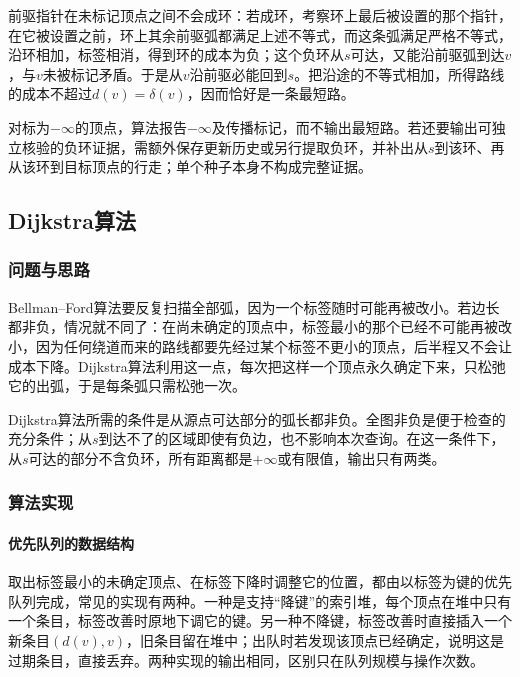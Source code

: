 前驱指针在未标记顶点之间不会成环：若成环，考察环上最后被设置的那个指针，在它被设置之前，环上其余前驱弧都满足上述不等式，而这条弧满足严格不等式，沿环相加，标签相消，得到环的成本为负；这个负环从$s$可达，又能沿前驱弧到达$v$，与$v$未被标记矛盾。于是从$v$沿前驱必能回到$s$。把沿途的不等式相加，所得路线的成本不超过$d(v)=\delta(v)$，因而恰好是一条最短路。

对标为$-\infty$的顶点，算法报告$-\infty$及传播标记，而不输出最短路。若还要输出可独立核验的负环证据，需额外保存更新历史或另行提取负环，并补出从$s$到该环、再从该环到目标顶点的行走；单个种子本身不构成完整证据。

\subsection{Dijkstra算法}
\label{sec:graph-opt-dijkstra}

\subsubsection{问题与思路}

Bellman--Ford算法要反复扫描全部弧，因为一个标签随时可能再被改小。若边长都非负，情况就不同了：在尚未确定的顶点中，标签最小的那个已经不可能再被改小，因为任何绕道而来的路线都要先经过某个标签不更小的顶点，后半程又不会让成本下降。Dijkstra算法利用这一点，每次把这样一个顶点永久确定下来，只松弛它的出弧，于是每条弧只需松弛一次。

Dijkstra算法所需的条件是从源点可达部分的弧长都非负。全图非负是便于检查的充分条件；从$s$到达不了的区域即使有负边，也不影响本次查询。在这一条件下，从$s$可达的部分不含负环，所有距离都是$+\infty$或有限值，输出只有两类。

\subsubsection{算法实现}

\paragraph{优先队列的数据结构}
取出标签最小的未确定顶点、在标签下降时调整它的位置，都由以标签为键的优先队列完成，常见的实现有两种。一种是支持“降键”的索引堆，每个顶点在堆中只有一个条目，标签改善时原地下调它的键。另一种不降键，标签改善时直接插入一个新条目$(d(v),v)$，旧条目留在堆中；出队时若发现该顶点已经确定，说明这是过期条目，直接丢弃。两种实现的输出相同，区别只在队列规模与操作次数。

